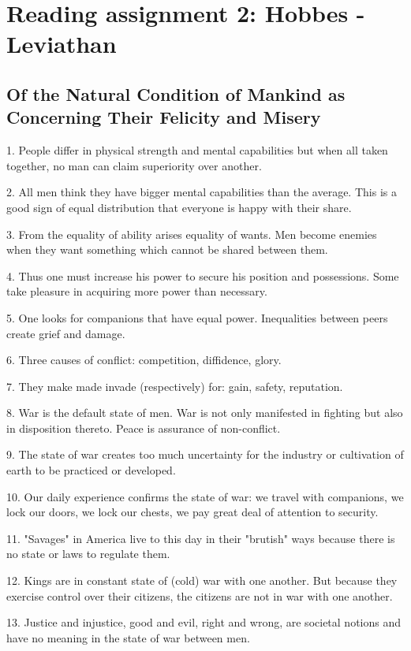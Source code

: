 \section{Reading assignment 2: Hobbes - Leviathan}

\subsection{Of the Natural Condition of Mankind as Concerning Their Felicity
and Misery}

1. People differ in physical strength and mental capabilities but when all
taken together, no man can claim superiority over another.

2. All men think they have bigger mental capabilities than the average. This
is a good sign of equal distribution that everyone is happy with their share.

3. From the equality of ability arises equality of wants. Men become enemies
when they want something which cannot be shared between them.

4. Thus one must increase his power to secure his position and possessions.
Some take pleasure in acquiring more power than necessary.

5. One looks for companions that have equal power. Inequalities between peers
create grief and damage.

6. Three causes of conflict: competition, diffidence, glory.

7. They make made invade (respectively) for: gain, safety, reputation.

8. War is the default state of men. War is not only manifested in fighting
but also in disposition thereto. Peace is assurance of non-conflict.

9. The state of war creates too much uncertainty for the industry or
cultivation of earth to be practiced or developed.

10. Our daily experience confirms the state of war: we travel with companions,
we lock our doors, we lock our chests, we pay great deal of attention to
security.

11. "Savages" in America live to this day in their "brutish" ways because there
is no state or laws to regulate them.

12. Kings are in constant state of (cold) war with one another. But because
they exercise control over their citizens, the citizens are not in war with
one another.

13. Justice and injustice, good and evil, right and wrong, are societal notions
and have no meaning in the state of war between men.

